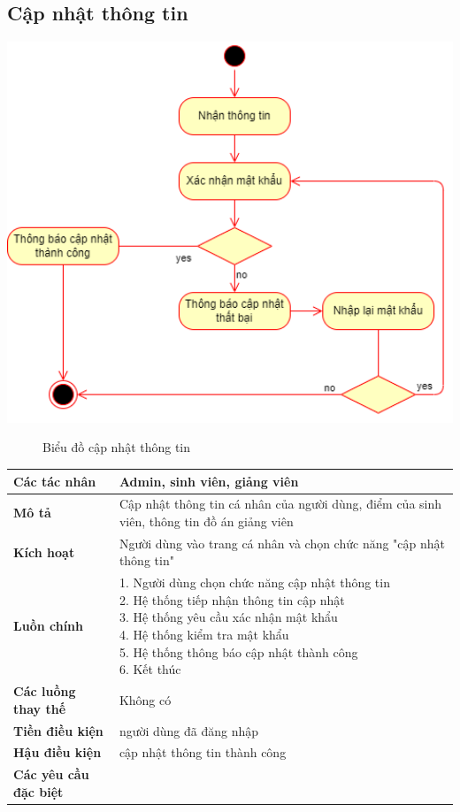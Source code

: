 \subsection{Cập nhật thông tin}
  \begin{center}
    \includegraphics[width=1.1\textwidth]{../drawio/activity/updatedata.png}
    \begin{figure}[h]
      \centering
      \caption{Biểu đồ cập nhật thông tin}
    \end{figure}
  \end{center}
  \begin{tabular}{|l|l|}
    \hline
    \textbf{Các tác nhân} & Admin, sinh viên, giảng viên\\
    \hline
    \textbf{Mô tả} & Cập nhật thông tin cá nhân của người dùng, điểm của sinh viên, thông tin đồ án giảng viên\\
    \hline
    \textbf{Kích hoạt} & Người dùng vào trang cá nhân và chọn chức năng "cập nhật thông tin" \\
    \hline 
    \textbf{Luồn chính} & \makecell[l]{1. Người dùng chọn chức năng cập nhật thông tin \\ 2. Hệ thống tiếp nhận thông tin cập nhật \\ 3. Hệ thống yêu cầu xác nhận mật khẩu \\ 4. Hệ thống kiểm tra mật khẩu \\ 5. Hệ thống thông báo cập nhật thành công \\ 6. Kết thúc} \\
    \hline
    \textbf{Các luồng thay thế} & Không có \\
    \hline
    \textbf{Tiền điều kiện} & người dùng đã đăng nhập \\
    \hline
    \textbf{Hậu điều kiện} & cập nhật thông tin thành công\\
    \hline
    \textbf{Các yêu cầu đặc biệt} & \\
    \hline
  \end{tabular}

